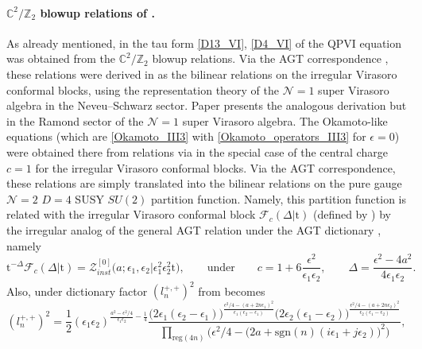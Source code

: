 \documentclass[12pt,a4paper]{article}
\numberwithin{equation}{section}
\begin{document}
\paragraph{$\mathbb{C}^2/\mathbb{Z}_2$ blowup relations of \cite{BS16b}.}
As already mentioned, 
in \cite{BST25} the tau form \eqref{D13_VI}, \eqref{D4_VI} of the QPVI equation was obtained from the $\mathbb{C}^2/\mathbb{Z}_2$ blowup relations. Via the AGT correspondence \cite{AGT09}, these relations were derived in \cite{BS14} as the bilinear relations on the irregular Virasoro conformal blocks, using the representation theory of the $\mathcal{N}=1$ super Virasoro algebra in the Neveu--Schwarz sector. Paper \cite{BS16b} presents the analogous derivation but in the Ramond sector of the $\mathcal{N}=1$ super Virasoro algebra. The Okamoto-like equations (which are \eqref{Okamoto_III3} with \eqref{Okamoto_operators_III3} for $\epsilon=0$) were obtained there from relations \cite[(4.47)]{BS16b} via \cite[(4.44), (4.41)]{BS16b} in the special case of the central charge $c=1$ for the irregular Virasoro conformal blocks. Via the AGT correspondence, these relations are simply translated into the bilinear relations on the pure gauge $\mathcal{N}=2$ $D=4$ SUSY $SU(2)$ partition function. Namely, this partition function is related with the irregular Virasoro conformal block $\mathcal{F}_c(\Delta|\mathrm{t})$ (defined by \cite[(3.6)]{BS16b}) by the irregular analog of the general AGT relation \cite[(C.23)]{BST25} under the AGT dictionary \cite[(C.24)]{BST25}, namely
\begin{equation}\label{AGT_dct}
\mathrm{t}^{-\Delta}\mathcal{F}_c(\Delta|\mathrm{t})=\mathcal{Z}^{[0]}_{inst}\big(a;\epsilon_1,\epsilon_2\big|\epsilon_1^2\epsilon_2^2\mathrm{t}\big), \qquad \textrm{under} \qquad c=1+6\frac{\epsilon^2}{\epsilon_1\epsilon_2}, \qquad   \Delta=\frac{\epsilon
^2-4a^2}{4\epsilon_1\epsilon_2}.  
\end{equation}
Also, under dictionary \cite[(C.31)]{BST25} factor $(l_n^{+,+})^2$ from \cite[(4.42)]{BS16b} becomes
\begin{equation}\label{l_n_++}
(l_n^{+,+})^2=\frac12(\epsilon_1\epsilon_2)^{\frac{a^2{-}\epsilon^2/4}{\epsilon_1\epsilon_2}-\frac14}\frac{\big(2\epsilon_1(\epsilon_2{-}\epsilon_1)\big)^{\frac{\epsilon^2/4{-}(a{+}2n\epsilon_1)^2}{\epsilon_1(\epsilon_2{-}\epsilon_1)}} \big(2\epsilon_2(\epsilon_1{-}\epsilon_2)\big)^{\frac{\epsilon^2/4{-}(a{+}2n\epsilon_2)^2}{\epsilon_2(\epsilon_1{-}\epsilon_2)}}}{\prod\limits_{\mathrm{reg}(4n)}\Big(\epsilon^2/4- \big(2a+\mathrm{sgn}(n)(i\epsilon_1+j\epsilon_2)\big)^2\Big)},   
\end{equation}
\end{document}
